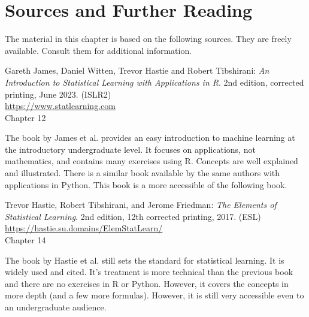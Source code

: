 %
%

\section*{Sources and Further Reading}

The material in this chapter is based on the following sources. They are freely available. Consult them for additional information.

\begin{tcolorbox}[colback=alert]
Gareth James, Daniel Witten, Trevor Hastie and Robert Tibshirani: \emph{An Introduction to Statistical Learning with Applications in R}. 2nd edition, corrected printing, June 2023. (ISLR2) \\
\vspace{1mm}
\url{https://www.statlearning.com} \\
\vspace{1mm}
Chapter 12
\end{tcolorbox}

The book by James et al. provides an easy introduction to machine learning at the introductory undergraduate level. It focuses on applications, not mathematics, and contains many exercises using R. Concepts are well explained and illustrated. There is a similar book available by the same authors with applications in Python. This book is a more accessible of the following book.

\begin{tcolorbox}[colback=alert]
Trevor Hastie, Robert Tibshirani, and Jerome Friedman: \emph{The Elements of Statistical Learning}. 2nd edition, 12th corrected printing, 2017. (ESL) \\
\vspace{1mm}
\url{https://hastie.su.domains/ElemStatLearn/} \\
\vspace{1mm}
Chapter 14
\end{tcolorbox}

The book by Hastie et al. still sets the standard for statistical learning. It is widely used and cited. It's treatment is more technical than the previous book and there are no exercises in R or Python. However, it covers the concepts in more depth (and a few more formulas). However, it is still very accessible even to an undergraduate audience.

